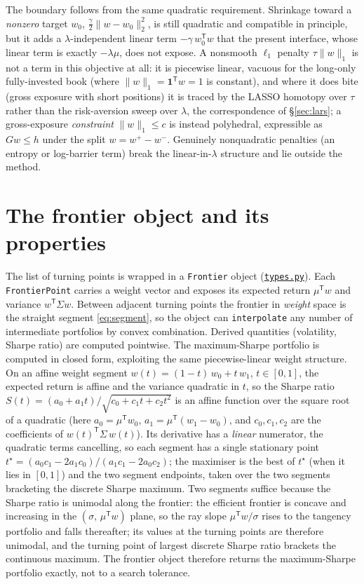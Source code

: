 \documentclass[11pt]{article}
\newcommand{\Sig}{\Sigma}
\newcommand{\trans}{^{\mathsf{T}}}
\newcommand{\repourl}{https://github.com/cvxgrp/cvxcla}
\newcommand{\srcref}{v1.8.1}
\newcommand{\srcfile}[2]{\href{\repourl/blob/\srcref/#1}{\texttt{#2}}}
\begin{document}
The boundary follows from the same quadratic requirement. Shrinkage toward a
\emph{nonzero} target $w_0$, $\tfrac{\gamma}{2}\lVert w - w_0\rVert_2^2$, is still
quadratic and compatible in principle, but it adds a $\lambda$-independent linear
term $-\gamma\, w_0\trans w$ that the present interface, whose linear term is exactly
$-\lambda\mu$, does not expose. A nonsmooth $\ell_1$ penalty $\tau\lVert w\rVert_1$ is
not a term in this objective at all: it is piecewise linear, vacuous for the
long-only fully-invested book (where $\lVert w\rVert_1 = \mathbf{1}\trans w = 1$ is
constant), and where it does bite (gross exposure with short positions) it is traced
by the LASSO homotopy over $\tau$ rather than the risk-aversion sweep over $\lambda$,
the correspondence of \S\ref{sec:lars}; a gross-exposure \emph{constraint}
$\lVert w\rVert_1 \le c$ is instead polyhedral, expressible as $G w \le h$ under the
split $w = w^+ - w^-$. Genuinely nonquadratic penalties (an entropy or log-barrier
term) break the linear-in-$\lambda$ structure and lie outside the method.

\section{The frontier object and its properties}
\label{sec:frontier}

The list of turning points is wrapped in a \texttt{Frontier} object
(\srcfile{src/cvxcla/types.py}{types.py}). Each \texttt{FrontierPoint} carries a weight vector and
exposes its expected return $\mu\trans w$ and variance $w\trans\Sig w$. Between adjacent
turning points the frontier in \emph{weight} space is the straight segment
\eqref{eq:segment}, so the object can \texttt{interpolate} any number of intermediate
portfolios by convex combination. Derived quantities (volatility, Sharpe ratio) are
computed pointwise. The maximum-Sharpe portfolio is computed in closed form,
exploiting the same piecewise-linear weight structure. On an affine weight segment
$w(t) = (1-t)\,w_0 + t\,w_1$, $t\in[0,1]$, the expected return is affine and the
variance quadratic in $t$, so the Sharpe ratio
$S(t) = (a_0 + a_1 t)/\sqrt{c_0 + c_1 t + c_2 t^2}$ is an affine function over the
square root of a quadratic (here $a_0 = \mu\trans w_0$, $a_1 = \mu\trans(w_1-w_0)$,
and $c_0,c_1,c_2$ are the coefficients of $w(t)\trans\Sig\,w(t)$). Its derivative has
a \emph{linear} numerator, the quadratic terms cancelling, so each segment has a
single stationary point $t^\star = (a_0 c_1 - 2 a_1 c_0)/(a_1 c_1 - 2 a_0 c_2)$; the
maximiser is the best of $t^\star$ (when it lies in $[0,1]$) and the two segment
endpoints, taken over the two segments bracketing the discrete Sharpe maximum. Two
segments suffice because the Sharpe ratio is unimodal along the frontier: the
efficient frontier is concave and increasing in the $(\sigma,\,\mu\trans w)$ plane,
so the ray slope $\mu\trans w/\sigma$ rises to the tangency portfolio and falls
thereafter; its values at the turning points are therefore unimodal, and the turning
point of largest discrete Sharpe ratio brackets the continuous maximum. The
frontier object therefore returns the maximum-Sharpe portfolio exactly, not to a
search tolerance.
\end{document}
